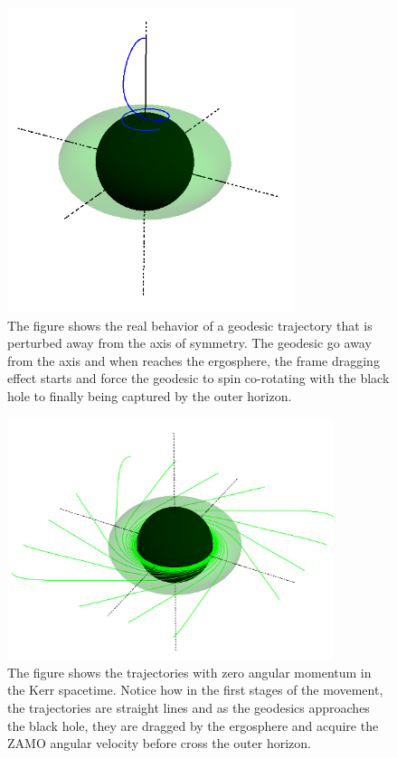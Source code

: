 \begin{figure}
\centering
 \hspace*{-0.05\textwidth}
\centerline{\includegraphics[width=0.75\textwidth]{img/Chapter4/ejein.png}}
\caption{The figure shows the real behavior of a geodesic trajectory that is perturbed away from the axis of symmetry. The geodesic go away from the axis and when reaches the ergosphere, the frame dragging effect starts and force the geodesic to spin co-rotating with the black hole to finally being captured by the outer horizon.}
\end{figure}

\begin{figure}
\centering
 \hspace*{-0.05\textwidth}
\centerline{\includegraphics[width=0.85\textwidth]{img/Chapter4/ZAMOS.png}}
\caption{The figure shows the trajectories with zero angular momentum in the Kerr spacetime. Notice how in the first stages of the movement, the trajectories are straight lines and as the geodesics approaches the black hole, they are dragged by the ergosphere and acquire the \gls{ZAMO} angular velocity before cross the outer horizon.}
\end{figure}



% 
% 
%
